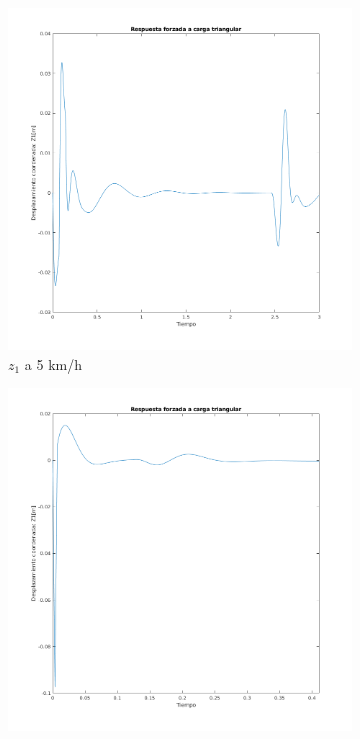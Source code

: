 \documentclass[oneside, a4paper, spanish, links]{amca}
\begin{document}
\Floatbarrier
\begin{figure}[h]
    \centering
    \begin{subfigure}[b]{0.475\textwidth}
        \centering
        \includegraphics[width=\textwidth]{difcent,picos,Z15kmh.png}
        \caption[]%
        {{\small $z_1$ a 5 km/h}}    
    \end{subfigure}
    \hfill
    \begin{subfigure}[b]{0.475\textwidth}  
        \centering 
        \includegraphics[width=\textwidth]{difcent,picos,Z1100kmh.png}

\end{subfigure}
\end{figure}
\end{document}
